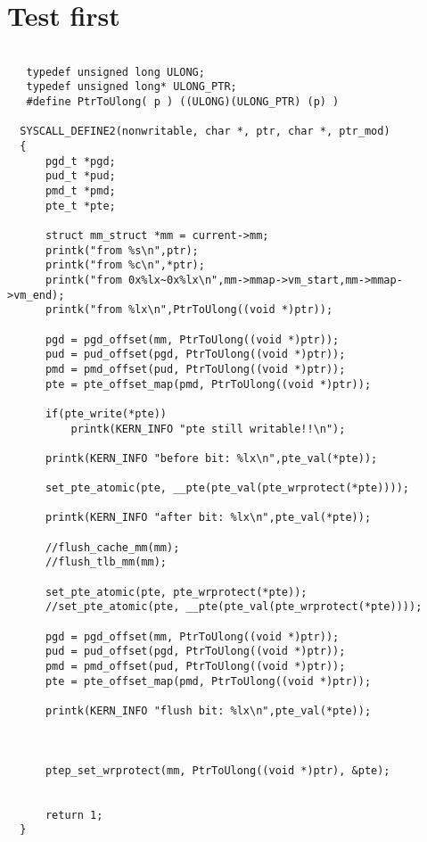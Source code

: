 \section{Test first}
  \begin{verbatim}
               
   typedef unsigned long ULONG;
   typedef unsigned long* ULONG_PTR;
   #define PtrToUlong( p ) ((ULONG)(ULONG_PTR) (p) )
               
  SYSCALL_DEFINE2(nonwritable, char *, ptr, char *, ptr_mod)
  { 
      pgd_t *pgd;
      pud_t *pud;
      pmd_t *pmd;
      pte_t *pte;
  
      struct mm_struct *mm = current->mm;
      printk("from %s\n",ptr);
      printk("from %c\n",*ptr);
      printk("from 0x%lx~0x%lx\n",mm->mmap->vm_start,mm->mmap->vm_end);
      printk("from %lx\n",PtrToUlong((void *)ptr));
  
      pgd = pgd_offset(mm, PtrToUlong((void *)ptr));
      pud = pud_offset(pgd, PtrToUlong((void *)ptr));
      pmd = pmd_offset(pud, PtrToUlong((void *)ptr));
      pte = pte_offset_map(pmd, PtrToUlong((void *)ptr));
  
      if(pte_write(*pte))
          printk(KERN_INFO "pte still writable!!\n");
  
      printk(KERN_INFO "before bit: %lx\n",pte_val(*pte));
  
      set_pte_atomic(pte, __pte(pte_val(pte_wrprotect(*pte))));
  
      printk(KERN_INFO "after bit: %lx\n",pte_val(*pte));
  
      //flush_cache_mm(mm);
      //flush_tlb_mm(mm);
  
      set_pte_atomic(pte, pte_wrprotect(*pte));
      //set_pte_atomic(pte, __pte(pte_val(pte_wrprotect(*pte))));
  
      pgd = pgd_offset(mm, PtrToUlong((void *)ptr));
      pud = pud_offset(pgd, PtrToUlong((void *)ptr));
      pmd = pmd_offset(pud, PtrToUlong((void *)ptr));
      pte = pte_offset_map(pmd, PtrToUlong((void *)ptr));
  
      printk(KERN_INFO "flush bit: %lx\n",pte_val(*pte));
  
  
  
      ptep_set_wrprotect(mm, PtrToUlong((void *)ptr), &pte);
  
  
      return 1;
  }
  \end{verbatim}
  
